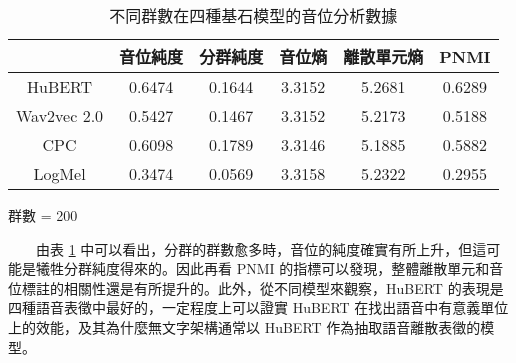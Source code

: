 \begin{table}[!htbp]
    \vspace{0.5cm}

    \begin{subtable}[t]{\textwidth}
        \centering
        \begin{tabular}{|c|c|c|c|c|c|} \hline
                        & 音位純度   & 分群純度   & 音位熵    & 離散單元熵  & PNMI   \\ \hline
            HuBERT      & 0.6474 & 0.1644 & 3.3152 & 5.2681 & 0.6289 \\ \hline    %
            Wav2vec 2.0 & 0.5427 & 0.1467 & 3.3152 & 5.2173 & 0.5188 \\ \hline    %
            CPC         & 0.6098 & 0.1789 & 3.3146 & 5.1885 & 0.5882 \\ \hline    %
            LogMel      & 0.3474 & 0.0569 & 3.3158 & 5.2322 & 0.2955 \\ \hline    %
        \end{tabular}
        \caption{群數 = 200}
        \label{tab:ch3-clu200-phn}
    \end{subtable}

    \caption{不同群數在四種基石模型的音位分析數據}
    \label{tab:single-cluster-results}
\end{table}
　　由表 \ref{tab:single-cluster-results} 中可以看出，分群的群數愈多時，音位的純度確實有所上升，但這可能是犧牲分群純度得來的。因此再看 PNMI 的指標可以發現，整體離散單元和音位標註的相關性還是有所提升的。此外，從不同模型來觀察，HuBERT 的表現是四種語音表徵中最好的，一定程度上可以證實 HuBERT 在找出語音中有意義單位上的效能，及其為什麼無文字架構通常以 HuBERT 作為抽取語音離散表徵的模型。

